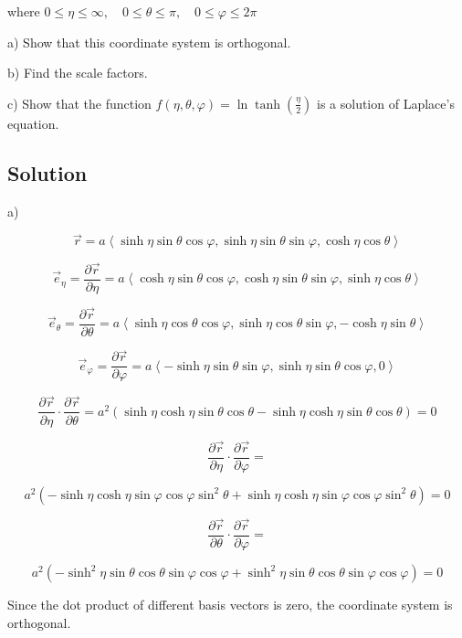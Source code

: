 \documentclass[12pt]{article}
\begin{document}
where \(0 \leq \eta \leq \infty, \quad 0 \leq \theta \leq \pi, \quad 0 \leq \varphi \leq 2 \pi \)

a) Show that this coordinate system is orthogonal.

b) Find the scale factors.

c) Show that the function \(f(\eta, \theta, \varphi)=\ln \tanh \left(\frac{\eta}{2}\right)\) is a solution of Laplace's equation.

\subsection{Solution}

a)

\[
    \vec{r} = a \left\langle \sinh \eta \sin \theta \cos \varphi, \sinh \eta \sin \theta \sin \varphi, \cosh \eta \cos \theta \right\rangle
\]

\[
    \vec{e}_\eta = \frac{\partial \vec{r}}{\partial \eta} = a \left\langle \cosh \eta \sin \theta \cos \varphi, \cosh \eta \sin \theta \sin \varphi, \sinh \eta \cos \theta \right\rangle
\]

\[
    \vec{e}_\theta = \frac{\partial \vec{r}}{\partial \theta} = a \left\langle \sinh \eta \cos \theta \cos \varphi, \sinh \eta \cos \theta \sin \varphi, -\cosh \eta \sin \theta \right\rangle
\]

\[
    \vec{e}_\varphi = \frac{\partial \vec{r}}{\partial \varphi} = a \left\langle -\sinh \eta \sin \theta \sin \varphi, \sinh \eta \sin \theta \cos \varphi, 0 \right\rangle
\]

\[
    \frac{\partial \vec{r}}{\partial \eta} \cdot \frac{\partial \vec{r}}{\partial \theta} =
    a^2 \left(\sinh \eta \cosh \eta \sin \theta \cos \theta - \sinh \eta \cosh \eta \sin \theta \cos \theta\right) = 0
\]

\[
    \frac{\partial \vec{r}}{\partial \eta} \cdot \frac{\partial \vec{r}}{\partial \varphi} =
\]

\[
    a^2 \left(-\sinh \eta \cosh \eta \sin \varphi \cos \varphi \sin^2 \theta + \sinh \eta \cosh \eta \sin \varphi \cos \varphi \sin^2 \theta\right) = 0
\]

\[
    \frac{\partial \vec{r}}{\partial \theta} \cdot \frac{\partial \vec{r}}{\partial \varphi} =
\]

\[
    a^2 \left(-\sinh^2 \eta \sin \theta \cos \theta \sin \varphi \cos \varphi + \sinh^2 \eta \sin \theta \cos \theta \sin \varphi \cos \varphi\right) = 0
\]

Since the dot product of different basis vectors is zero, the coordinate system is orthogonal.
\end{document}

